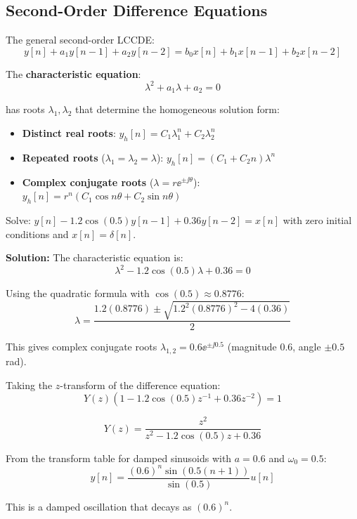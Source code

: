 \subsection{Second-Order Difference Equations}

The general second-order LCCDE:
\begin{equation}
y[n] + a_1 y[n-1] + a_2 y[n-2] = b_0 x[n] + b_1 x[n-1] + b_2 x[n-2]
\end{equation}

The \textbf{characteristic equation}:
\begin{equation}
\lambda^2 + a_1\lambda + a_2 = 0
\end{equation}

has roots $\lambda_1, \lambda_2$ that determine the homogeneous solution form:
\begin{itemize}
    \item \textbf{Distinct real roots}: $y_h[n] = C_1\lambda_1^n + C_2\lambda_2^n$
    \item \textbf{Repeated roots} ($\lambda_1 = \lambda_2 = \lambda$): $y_h[n] = (C_1 + C_2 n)\lambda^n$
    \item \textbf{Complex conjugate roots} ($\lambda = r\ee^{\pm\jj\theta}$): $y_h[n] = r^n(C_1\cos n\theta + C_2\sin n\theta)$
\end{itemize}

\begin{examplebox}[title=Example: Second-Order System with Complex Poles]
Solve: $y[n] - 1.2\cos(0.5)y[n-1] + 0.36y[n-2] = x[n]$ with zero initial conditions and $x[n] = \delta[n]$.

\textbf{Solution:}
The characteristic equation is:
\begin{equation}
\lambda^2 - 1.2\cos(0.5)\lambda + 0.36 = 0
\end{equation}

Using the quadratic formula with $\cos(0.5) \approx 0.8776$:
\begin{equation}
\lambda = \frac{1.2(0.8776) \pm \sqrt{1.2^2(0.8776)^2 - 4(0.36)}}{2}
\end{equation}

This gives complex conjugate roots $\lambda_{1,2} = 0.6\ee^{\pm\jj 0.5}$ (magnitude 0.6, angle $\pm 0.5$ rad).

Taking the $z$-transform of the difference equation:
\begin{equation}
Y(z)\left(1 - 1.2\cos(0.5)z^{-1} + 0.36z^{-2}\right) = 1
\end{equation}

\begin{equation}
Y(z) = \frac{z^2}{z^2 - 1.2\cos(0.5)z + 0.36}
\end{equation}

From the transform table for damped sinusoids with $a = 0.6$ and $\omega_0 = 0.5$:
\begin{equation}
\boxed{y[n] = \frac{(0.6)^n \sin(0.5(n+1))}{\sin(0.5)} u[n]}
\end{equation}

This is a damped oscillation that decays as $(0.6)^n$.
\end{examplebox}

